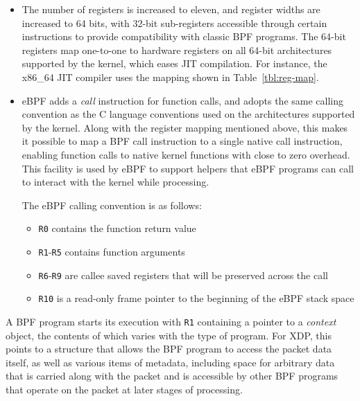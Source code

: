 \documentclass[10pt]{sig-alternate-05-2015}
\begin{document}
\begin{itemize}
\item The number of registers is increased to eleven, and register widths are
increased to 64 bits, with 32-bit sub-registers accessible through certain
instructions to provide compatibility with classic BPF programs. The 64-bit
registers map one-to-one to hardware registers on all 64-bit architectures
supported by the kernel, which eases JIT compilation. For instance, the x86\_64
JIT compiler uses the mapping shown in Table \ref{tbl:reg-map}.

\item eBPF adds a \emph{call} instruction for function calls, and adopts the same calling
convention as the C language conventions used on the architectures supported
by the kernel. Along with the register mapping mentioned above, this makes it
possible to map a BPF call instruction to a single native call instruction,
enabling function calls to native kernel functions with close to zero
overhead. This facility is used by eBPF to support helpers that eBPF programs
can call to interact with the kernel while processing.

The eBPF calling convention is as follows:
\begin{itemize}
\item \texttt{R0} contains the function return value
\item \texttt{R1}-\texttt{R5} contains function arguments
\item \texttt{R6}-\texttt{R9} are callee saved registers that will be preserved across the call
\item \texttt{R10} is a read-only frame pointer to the beginning of the eBPF stack space
\end{itemize}
\end{itemize}


A BPF program starts its execution with \texttt{R1} containing a pointer to a \emph{context}
object, the contents of which varies with the type of program. For XDP, this
points to a structure that allows the BPF program to access the packet data
itself, as well as various items of metadata, including space for arbitrary data
that is carried along with the packet and is accessible by other BPF programs
that operate on the packet at later stages of processing.
\end{document}
